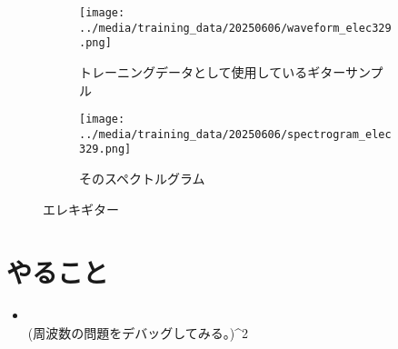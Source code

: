 \documentclass[a4paper, 12pt]{article}
\begin{document}
\begin{figure}
\centering
\begin{subfigure}{1.0\textwidth}
  \centering
  \texttt{[image: ../media/training\_data/20250606/waveform\_elec329.png]}
  \caption{トレーニングデータとして使用しているギターサンプル}
  \label{fig:eGuitWave}
\end{subfigure}%
\vspace{5mm}
\begin{subfigure}{1.0\textwidth}
  \centering
  \texttt{[image: ../media/training\_data/20250606/spectrogram\_elec329.png]}
  \caption{そのスペクトルグラム}
  \label{fig:eGuitSpectro}
\end{subfigure}
\caption{エレキギター}
\label{fig:elecGuit}
\end{figure}


\section*{やること}
\begin{itemize}
    \item \\(周波数の問題をデバッグしてみる。)^2
\end{itemize}

%
%
\end{document}
